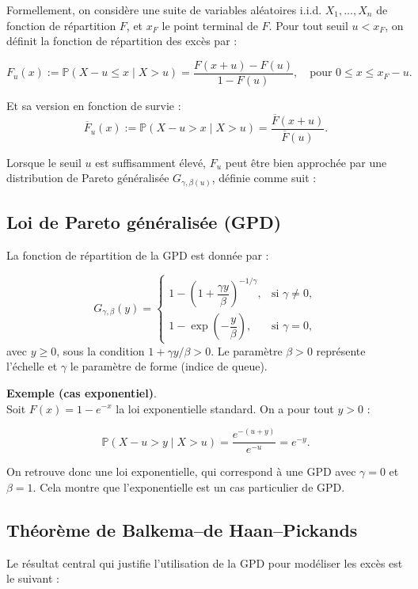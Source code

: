 \documentclass{article}
\theoremstyle{plain}
\theoremstyle{definition}
\theoremstyle{plain}
\begin{document}
\medskip
Formellement, on considère une suite de variables aléatoires i.i.d. \(X_1, \dots, X_n\) de fonction de répartition \(F\), et \(x_F\) le point terminal de \(F\). Pour tout seuil \(u < x_F\), on définit la fonction de répartition des excès par :

\[
F_u(x) := \mathbb{P}(X - u \leq x \mid X > u) = \frac{F(x + u) - F(u)}{1 - F(u)},
\quad \text{pour } 0 \leq x \leq x_F - u.
\]

Et sa version en fonction de survie :
\[
\overline{F}_u(x) := \mathbb{P}(X - u > x \mid X > u) = \frac{\overline{F}(x + u)}{\overline{F}(u)}.
\]

Lorsque le seuil \(u\) est suffisamment élevé, \(F_u\) peut être bien approchée par une distribution de Pareto généralisée \(G_{\gamma, \beta(u)}\), définie comme suit :

\subsection{Loi de Pareto généralisée (GPD)}

La fonction de répartition de la GPD est donnée par :

\[
G_{\gamma, \beta}(y) =
\begin{cases}
1 - \left(1 + \dfrac{\gamma y}{\beta}\right)^{-1/\gamma}, & \text{si } \gamma \neq 0, \\
1 - \exp\left(-\dfrac{y}{\beta}\right), & \text{si } \gamma = 0,
\end{cases}
\]
avec \( y \geq 0 \), sous la condition \(1 + \gamma y/\beta > 0\). Le paramètre \(\beta > 0\) représente l’échelle et \(\gamma\) le paramètre de forme (indice de queue).

\medskip
\textbf{Exemple (cas exponentiel)}.\\
Soit \(F(x) = 1 - e^{-x}\) la loi exponentielle standard. On a pour tout \(y > 0\) :

\[
\mathbb{P}(X - u > y \mid X > u) = \frac{e^{-(u + y)}}{e^{-u}} = e^{-y}.
\]

On retrouve donc une loi exponentielle, qui correspond à une GPD avec \(\gamma = 0\) et \(\beta = 1\). Cela montre que l’exponentielle est un cas particulier de GPD.

\subsection{Théorème de Balkema–de Haan–Pickands}

Le résultat central qui justifie l’utilisation de la GPD pour modéliser les excès est le suivant :
\end{document}
